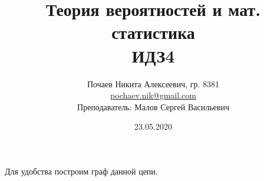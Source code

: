 

\title{Теория вероятностей и мат. статистика \\ ИДЗ4}
\date{23.05.2020}
\author{Почаев Никита Алексеевич, гр. 8381 \\ \href{mailto:pochaev.nik@gmail.com}{pochaev.nik@gmail.com} \\ Преподаватель: Малов Сергей Васильевич}


	
\renewcommand{\figurename}{Рисунок}

\maketitle

\begin{figure}[H]
\end{figure}
\newpage
Для удобства построим граф данной цепи.
